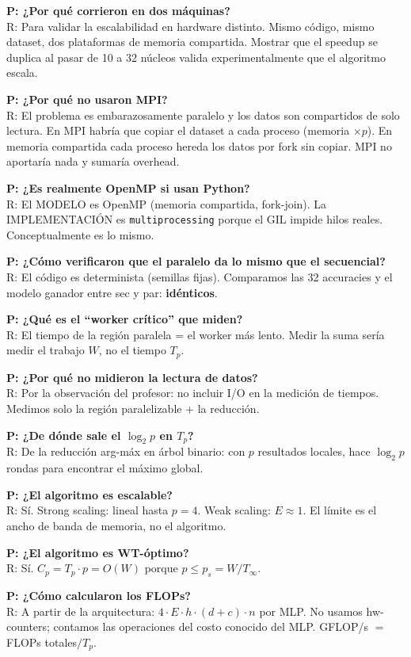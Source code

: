 \documentclass[11pt,a4paper]{article}
\begin{document}
\textbf{P: ¿Por qué corrieron en dos máquinas?}\\
R: Para validar la escalabilidad en hardware distinto. Mismo código, mismo
dataset, dos plataformas de memoria compartida. Mostrar que el speedup se duplica
al pasar de 10 a 32 núcleos valida experimentalmente que el algoritmo escala.

\textbf{P: ¿Por qué no usaron MPI?}\\
R: El problema es embarazosamente paralelo y los datos son compartidos de solo
lectura. En MPI habría que copiar el dataset a cada proceso (memoria $\times p$).
En memoria compartida cada proceso hereda los datos por fork sin copiar. MPI no
aportaría nada y sumaría overhead.

\textbf{P: ¿Es realmente OpenMP si usan Python?}\\
R: El MODELO es OpenMP (memoria compartida, fork-join). La IMPLEMENTACIÓN es
\texttt{multiprocessing} porque el GIL impide hilos reales. Conceptualmente es
lo mismo.

\textbf{P: ¿Cómo verificaron que el paralelo da lo mismo que el secuencial?}\\
R: El código es determinista (semillas fijas). Comparamos las 32 accuracies y el
modelo ganador entre sec y par: \textbf{idénticos}.

\textbf{P: ¿Qué es el ``worker crítico'' que miden?}\\
R: El tiempo de la región paralela = el worker más lento. Medir la suma sería
medir el trabajo $W$, no el tiempo $T_p$.

\textbf{P: ¿Por qué no midieron la lectura de datos?}\\
R: Por la observación del profesor: no incluir I/O en la medición de tiempos.
Medimos solo la región paralelizable + la reducción.

\textbf{P: ¿De dónde sale el $\log_2 p$ en $T_p$?}\\
R: De la reducción arg-máx en árbol binario: con $p$ resultados locales, hace
$\log_2 p$ rondas para encontrar el máximo global.

\textbf{P: ¿El algoritmo es escalable?}\\
R: Sí. Strong scaling: lineal hasta $p=4$. Weak scaling: $E\approx 1$. El límite
es el ancho de banda de memoria, no el algoritmo.

\textbf{P: ¿El algoritmo es WT-óptimo?}\\
R: Sí. $C_p=T_p\cdot p = O(W)$ porque $p\le p_s = W/T_\infty$.

\textbf{P: ¿Cómo calcularon los FLOPs?}\\
R: A partir de la arquitectura: $4\cdot E\cdot h\cdot(d+c)\cdot n$ por MLP. No
usamos hw-counters; contamos las operaciones del costo conocido del MLP.
GFLOP/s $=$ FLOPs totales$/T_p$.
\end{document}
